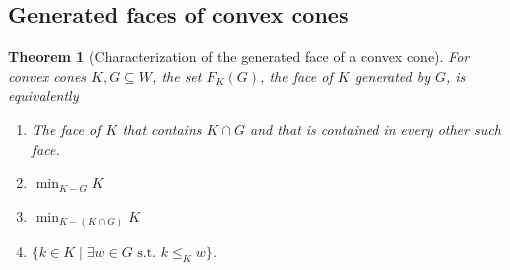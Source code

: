\documentclass{article}
\theoremstyle{plain}
\newtheorem{theorem}{Theorem}[section]
\theoremstyle{definition}
\theoremstyle{remark}
\begin{document}
\subsection{Generated faces of convex cones}
\label{loc:body.lattice_minima.generated_faces_of_convex_cones}
\begin{theorem}[Characterization of the generated face of a convex cone]
\label{loc:characterization_of_the_generated_face_of_a_convex_cone.statement}
For convex cones $K, G \subseteq W$, the set $F_K(G)$, the face of $K$ generated by $G$, is equivalently
\begin{enumerate}
\item The face of $K$ that contains $K \cap G$ and that is contained in every other such face.
\item $\min_{K-G} K$
\item $\min_{K - (K \cap G)}K$
\item $\{k \in K \mid \exists w \in G \text{ s.t. } k \leq_{K} w\}$.
\end{enumerate}
\end{theorem}
\end{document}
